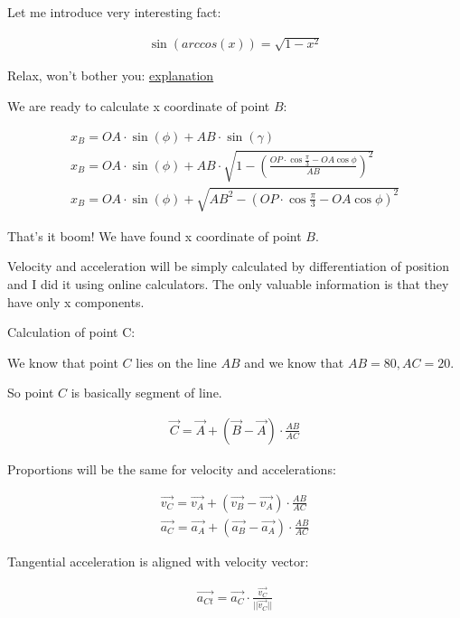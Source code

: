 \documentclass{article}
\begin{document}
Let me introduce very interesting fact:

\begin{align}
    \sin(arccos(x)) = \sqrt{1 - x^2}
\end{align}

Relax, won't bother you: \href{https://math.stackexchange.com/questions/345077/cos-arcsinx-sqrt1-x2-how}{explanation}

We are ready to calculate x coordinate of point $B$:

\begin{align}
    x_B = OA \cdot \sin{(\phi)} + AB \cdot \sin{(\gamma)}                                                         \\
    x_B = OA \cdot \sin{(\phi)} + AB \cdot \sqrt{1 - (\frac{OP \cdot \cos{\frac{\pi}{3}} - OA \cos{\phi}}{AB})^2} \\
    x_B = OA \cdot \sin{(\phi)} + \sqrt{AB^2 - (OP \cdot \cos{\frac{\pi}{3}} - OA \cos{\phi})^2}
\end{align}

That's it boom! We have found x coordinate of point $B$.

Velocity and acceleration will be simply calculated by differentiation of position
and I did it using online calculators. The only valuable information is that they have only x components.

Calculation of point C:

We know that point $C$ lies on the line $AB$ and we know that $AB = 80, AC = 20$.

So point $C$ is basically segment of line.

\begin{align}
    \vec{C} = \vec{A} + (\vec{B} - \vec{A}) \cdot \frac{AB}{AC}
\end{align}

Proportions will be the same for velocity and accelerations:

\begin{align}
    \vec{v_C} = \vec{v_A} + (\vec{v_B} - \vec{v_A}) \cdot \frac{AB}{AC} \\
    \vec{a_C} = \vec{a_A} + (\vec{a_B} - \vec{a_A}) \cdot \frac{AB}{AC}
\end{align}

Tangential acceleration is aligned with velocity vector:

\begin{align}
    \vec{a_{Ct}} = \vec{a_C} \cdot \frac{\vec{v_C}}{|| \vec{v_C} ||}
\end{align}
\end{document}
